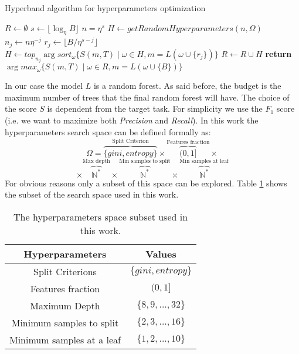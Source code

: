 \documentclass[11pt, a4paper]{article}
\begin{document}
  \begin{algorithm}
    \caption{Hyperband algorithm for hyperparameters optimization}
    \label{algorithm:hyperband}
    \begin{algorithmic}[1]
        \State $R \gets \emptyset$
        \State $s \gets \lfloor \log_{\eta}{B} \rfloor$
        \State $n = \eta^{s}$
          \State $H \gets getRandomHyperparameters(n,\Omega)$
            \State $n_{j} \gets n\eta^{-j}$
            \State $r_{j} \gets \lfloor B/\eta^{s-j} \rfloor$
            \State $H \gets top_{n_{j}} \arg sort_{\omega} \{S(m, T) \mid \omega \in H, m=L(\omega \cup \{r_{j}\})\}$
          \EndFor
          \State $R \gets R \cup H$
        \EndFor
        \State \textbf{return} $\arg max_{\omega} \{S(m, T) \mid \omega \in R, m=L(\omega \cup \{B\})\}$
      \EndProcedure
    \end{algorithmic}
  \end{algorithm}

  In our case the model $L$ is a random forest. As said before, the budget is the maximum number of trees that the final random forest will have. The choice of the score $S$ is dependent from the target task. For simplicity we use the $F_{1}$ score (i.e. we want to maximize both \textit{Precision} and \textit{Recall}). In this work the hyperparameters search space can be defined formally as:
  \[\Omega = \overbrace{\{gini, entropy\}}^{\text{Split Criterion}} \times \overbrace{(0, 1]}^{\text{Features fraction}} \times\]
  \[\times \overbrace{\mathbb{N}^{*}}^{\text{Max depth}} \times \overbrace{\mathbb{N}^{*}}^{\text{Min samples to split}} \times \overbrace{\mathbb{N}^{*}}^{\text{Min samples at leaf}}\]
  For obvious reasons only a subset of this space can be explored. Table \ref{table:hyperparameters} shows the subset of the search space used in this work.

  \begin{table}
    \centering
    \begin{tabular}{|c c|}
      \hline
      Hyperparameters & Values \\
      \hline\hline
      Split Criterions & $\{gini, entropy\}$ \\
      \hline
      Features fraction & $(0, 1]$ \\
      \hline
      Maximum Depth & $\{8,9,...,32\}$ \\
      \hline
      Minimum samples to split & $\{2,3,...,16\}$ \\
      \hline
      Minimum samples at a leaf & $\{1,2,...,10\}$ \\
      \hline
    \end{tabular}
    \caption{The hyperparameters space subset used in this work.}
    \label{table:hyperparameters}
  \end{table}
\end{document}
